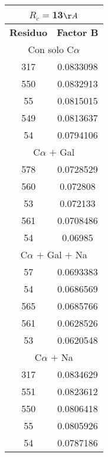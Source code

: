 \begin{tabular}[c]{|c|c|}
\multicolumn{2}{c}{$R_c=$13$\AA$}\\\hline
\textbf{Residuo}&\textbf{Factor B}\\\hline
\multicolumn{2}{c}{Con solo C$\alpha$}\\\hline
       317& 0.0833098\\
       550& 0.0832913\\
        55& 0.0815015\\
       549& 0.0813637\\
        54& 0.0794106\\\hline
\multicolumn{2}{c}{C$\alpha$ $+$ Gal}\\\hline
       578& 0.0728529\\
       560&  0.072808\\
        53&  0.072133\\
       561& 0.0708486\\
        54&   0.06985\\\hline
\multicolumn{2}{c}{C$\alpha$ $+$ Gal $+$ Na}\\\hline
        57& 0.0693383\\
        54& 0.0686569\\
       565& 0.0685766\\
       561& 0.0628526\\
        53& 0.0620548\\\hline
\multicolumn{2}{c}{C$\alpha$ $+$ Na}\\\hline
       317& 0.0834629\\
       551& 0.0823612\\
       550& 0.0806418\\
        55& 0.0805926\\
        54& 0.0787186\\\hline
\end{tabular}
